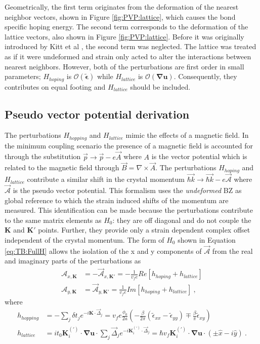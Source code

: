 Geometrically, the first term originates from the deformation of the nearest neighbor vectors, shown in Figure \ref{fig:PVP:lattice}, which causes the bond specific hoping energy.
The second term corresponds to the deformation of the lattice vectors, also shown in Figure \ref{fig:PVP:lattice}.
Before it was originally introduced by Kitt et al \cite{Kitt2012}, the second term was neglected.
The lattice was treated as if it were undeformed and strain only acted to alter the interactions between nearest neighbors.
However, both of the perturbations are first order in small parameters; $H_{hoping}$ is $\mathcal{O}(\tilde{\bm{\epsilon}})$ while $H_{lattice}$ is $\mathcal{O}(\bm{\nabla u})$.
Consequently, they contributes on equal footing and $H_{lattice}$ should be included.

\subsection{Pseudo vector potential derivation}
The perturbations $H_{hopping}$ and $H_{lattice}$ mimic the effects of a magnetic field.
In the minimum coupling scenario the presence of a magnetic field is accounted for through the substitution $\vec{p} \rightarrow \vec{p} - e \vec{A}$ where $A$ is the vector potential which is related to the magnetic field through $\vec{B}=\nabla \times \vec{A}$.
The perturbations $H_{hoping}$ and $H_{lattice}$ contribute a similar shift in the crystal momentum $\vec{\hbar k} \rightarrow \vec{\hbar k} - e \vec{\mathcal{A}}$ where $\vec{\mathcal{A}}$ is the pseudo vector potential.
This formalism uses the \emph{undeformed} BZ as global reference to which the strain induced shifts of the momentum are measured.
This identification can be made because the perturbations contribute to the same matrix elements as $H_0$: they are off diagonal and do not couple the $\bm{K}$ and $\bm{K'}$ points.
Further, they provide only a strain dependent complex offset independent of the crystal momentum.
The form of $H_0$ shown in Equation \ref{eq:TB:FullH} allows the isolation of the x and y components of $\vec{\mathcal{A}}$ from the real and imaginary parts of the perturbations as
\begin{align}
  \mathcal{A}_{x,\bm{K}}&=-\vec{\mathcal{A}}_{x,\bm{K'}}=-\frac{1}{v_f e} Re[h_{hoping}+h_{lattice}] \nonumber \\
  \mathcal{A}_{y,\bm{K}}&=\vec{\mathcal{A}}_{y,\bm{K'}}= \frac{1}{v_f e} Im[h_{hoping}+h_{lattice}] \label{eq:PVP:AfromH}\ ,
\end{align}
where 
\begin{align}
  h_{hopping}&=-\sum_{j} \delta t_j e^{-i \bm{K} \cdot \vec{\Delta}_j}=
    v_f e \frac{\phi_0}{2a} \left(- \frac{\beta}{2 \pi} (\tilde{\epsilon}_{xx}-\tilde{\epsilon}_{yy})
    \mp \frac{\beta}{\pi} \tilde{\epsilon}_{xy} \right) \nonumber \\
  h_{lattice}&=i t_0  \bm{K}_i^{(')} \cdot \bm{\nabla u} \cdot \sum_{j} \vec{\Delta}_j e^{-i \bm{K}_i^{(')} \cdot \vec{\Delta}_j}
    =\hbar v_f \bm{K}_i^{(')}\cdot \bm{\nabla u} \cdot \left( \pm \hat{x}-i \hat{y}\right)  \label{eq:PVP:nocurl} \ .
\end{align}
